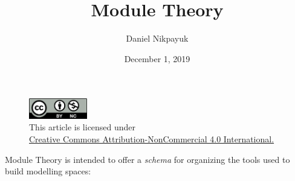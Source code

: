 \documentclass[twoside]{article}
\title{Module Theory}
\author{Daniel Nikpayuk}
\date{December 1, 2019}
\begin{document}
\maketitle
\thispagestyle{empty}

\begin{figure}[h]
\centering
\includegraphics[width=1in]{cc-by-nc.png}\\[0.1in]
\tiny This article is licensed under \\
\href{http://creativecommons.org/licenses/by-nc/4.0/}
{Creative Commons Attribution-NonCommercial 4.0 International.}\\[0.3in]
\end{figure}

Module Theory is intended to offer a \emph{schema} for organizing the tools used to build modelling spaces:\\[0.25cm]
\end{document}
